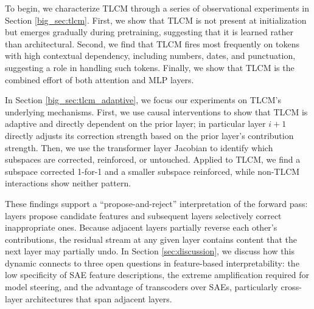 To begin, we characterize TLCM through a series of observational experiments in Section \ref{big_sec:tlcm}. First, we show that TLCM is not present at initialization but emerges gradually during pretraining, suggesting that it is learned rather than architectural. Second, we find that TLCM fires most frequently on tokens with high contextual dependency, including numbers, dates, and punctuation, suggesting a role in handling such tokens. Finally, we show that TLCM is the combined effort of both attention and MLP layers.

In Section \ref{big_sec:tlcm_adaptive}, we focus our experiments on TLCM's underlying mechanisms. First, we use causal interventions to show that TLCM is adaptive and directly dependent on the prior layer; in particular layer $i+1$ directly adjusts its correction strength based on the prior layer's contribution strength. Then, we use the transformer layer Jacobian to identify which subspaces are corrected, reinforced, or untouched. Applied to TLCM, we find a subspace corrected 1-for-1 and a smaller subspace reinforced, while non-TLCM interactions show neither pattern.

These findings support a ``propose-and-reject'' interpretation of the forward pass: layers propose candidate features and subsequent layers selectively correct inappropriate ones. Because adjacent layers partially reverse each other's contributions, the residual stream at any given layer contains content that the next layer may partially undo. In Section \ref{sec:discussion}, we discuss how this dynamic connects to three open questions in feature-based interpretability: the low specificity of SAE feature descriptions, the extreme amplification required for model steering, and the advantage of transcoders over SAEs, particularly cross-layer architectures that span adjacent layers.




